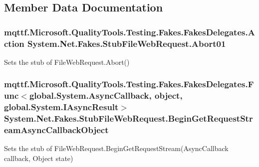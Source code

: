 \subsection{Member Data Documentation}
\hypertarget{class_system_1_1_net_1_1_fakes_1_1_stub_file_web_request_a32873bdbac8bde0201c10bc1978ff83b}{
\subsubsection[{Abort01}]{\setlength{\rightskip}{0pt plus 5cm}mqttf.\-Microsoft.\-Quality\-Tools.\-Testing.\-Fakes.\-Fakes\-Delegates.\-Action System.\-Net.\-Fakes.\-Stub\-File\-Web\-Request.\-Abort01}}\label{class_system_1_1_net_1_1_fakes_1_1_stub_file_web_request_a32873bdbac8bde0201c10bc1978ff83b}


Sets the stub of File\-Web\-Request.\-Abort()

\hypertarget{class_system_1_1_net_1_1_fakes_1_1_stub_file_web_request_ad38af2c96d41af7e90e826a3df67cf39}{
\subsubsection[{Begin\-Get\-Request\-Stream\-Async\-Callback\-Object}]{\setlength{\rightskip}{0pt plus 5cm}mqttf.\-Microsoft.\-Quality\-Tools.\-Testing.\-Fakes.\-Fakes\-Delegates.\-Func$<$global.\-System.\-Async\-Callback, object, global.\-System.\-I\-Async\-Result$>$ System.\-Net.\-Fakes.\-Stub\-File\-Web\-Request.\-Begin\-Get\-Request\-Stream\-Async\-Callback\-Object}}\label{class_system_1_1_net_1_1_fakes_1_1_stub_file_web_request_ad38af2c96d41af7e90e826a3df67cf39}


Sets the stub of File\-Web\-Request.\-Begin\-Get\-Request\-Stream(\-Async\-Callback callback, Object state)

